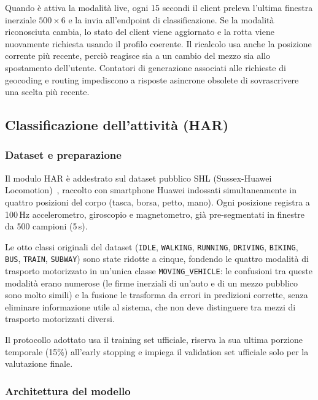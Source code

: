 \documentclass[conference]{IEEEtran}
\begin{document}
Quando è attiva la modalità live, ogni 15 secondi il client preleva
l'ultima finestra inerziale $500\times6$ e la invia all'endpoint di
classificazione. Se la modalità riconosciuta cambia, lo stato del
client viene aggiornato e la rotta viene nuovamente richiesta usando il
profilo coerente. Il ricalcolo usa anche la posizione corrente più
recente, perciò reagisce sia a un cambio del mezzo sia allo spostamento
dell'utente. Contatori di generazione associati alle richieste di
geocoding e routing impediscono a risposte asincrone obsolete di
sovrascrivere una scelta più recente. 

\subsection{Classificazione dell'attività (HAR)}

\subsubsection{Dataset e preparazione}

Il modulo HAR è addestrato sul dataset pubblico SHL (Sussex-Huawei
Locomotion)~\cite{wang2018shl}, raccolto con smartphone Huawei
indossati simultaneamente in quattro posizioni del corpo (tasca,
borsa, petto, mano). Ogni posizione registra a 100\,Hz accelerometro,
giroscopio e magnetometro, già pre-segmentati in finestre da 500
campioni (5\,s).

Le otto classi originali del dataset (\texttt{IDLE}, \texttt{WALKING},
\texttt{RUNNING}, \texttt{DRIVING}, \texttt{BIKING}, \texttt{BUS},
\texttt{TRAIN}, \texttt{SUBWAY}) sono state ridotte a cinque, fondendo
le quattro modalità di trasporto motorizzato in un'unica classe
\texttt{MOVING\_VEHICLE}: le confusioni tra queste modalità erano
numerose (le firme inerziali di un'auto e di un mezzo pubblico sono
molto simili) e la fusione le trasforma da errori in predizioni
corrette, senza eliminare informazione utile al sistema, che non deve
distinguere tra mezzi di trasporto motorizzati diversi.

Il protocollo adottato usa il training set ufficiale,
riserva la sua ultima porzione temporale (15\%) all'early stopping e
impiega il validation set ufficiale solo per la valutazione finale.

\subsubsection{Architettura del modello}
\end{document}
